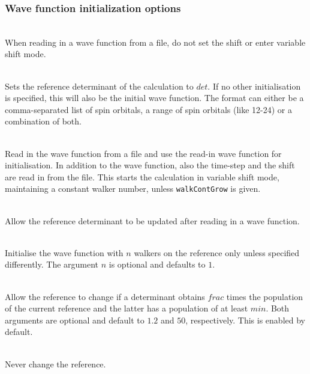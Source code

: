 \documentclass[a4paper,notitlepage,dvipsnames]{scrreprt}
\newcommand\codeitem[1]{\needspace{1.5\baselineskip}\item[\textnormal{\ttfamily #1 \nopagebreak}] \hfill \\ \nopagebreak}
\begin{document}
  \subsubsection{Wave function initialization options}
  \begin{description}
    \codeitem{\textcolor{oblue}{walkContGrow}}
    When reading in a wave function from a file, do not set the shift or enter
    variable shift mode.
    \codeitem{\textcolor{oblue}{defineDet $det$}}
    Sets the reference determinant of the calculation to $det$. If no other
    initialisation is specified, this will also be the initial
    wave function. The format can either be a comma-separated list of spin
    orbitals, a range of spin orbitals (like 12-24) or a combination of both.
    \codeitem{readPops}
    Read in the wave function from a file and use the read-in wave function
    for initialisation. In addition to the wave function, also the time-step
    and the shift are read in from the file. This starts the calculation in
    variable shift mode, maintaining a constant walker number, unless
    \texttt{walkContGrow} is given.
    \codeitem{readpops-changeref}
    Allow the reference determinant to be updated after reading in a
    wave function.
    \codeitem{startSinglePart $n$}
    Initialise the wave function with $n$ walkers on the reference only unless
    specified differently. The argument $n$ is optional and defaults to $1$.
    \codeitem{proje-changeRef $frac$ $min$}
    Allow the reference to change if a determinant obtains $frac$ times the
    population of the current reference and the latter has a population of at
    least $min$. Both arguments are optional and default to $1.2$ and $50$,
    respectively. This is enabled by default.
    \codeitem{no-changeref}
    Never change the reference.
  \end{description}
\end{document}

